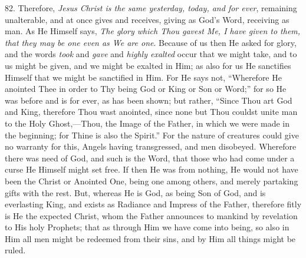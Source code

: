 82. Therefore, \emph{Jesus Christ
is the same yesterday, today, and for ever}, remaining unalterable,
and at once gives and receives, giving as God's Word, receiving as
man. As He Himself says, \emph{The glory which Thou gavest Me, I have
given to them, that they may be one even as We are one}. Because of
us then He asked for glory, and the words \emph{took} and \emph{gave}
and \emph{highly exalted} occur that we might take, and to us might be
given, and we might be exalted in Him; as also for us He
sanctifies Himself that we might be sanctified in Him. For He says
not, ``Wherefore He anointed Thee in order to Thy being God or King or
Son or Word;'' for so He was before and is for ever, as has been shown;
but rather, ``Since Thou art God and King, therefore Thou wast
anointed, since none but Thou couldst unite man to the Holy
Ghost,—Thou, the Image of the Father, in which we were made in the
beginning; for Thine is also the Spirit.'' For the nature of creatures
could give no warranty for this, Angels having transgressed, and men
disobeyed. Wherefore there was need of God, and such is the Word, that
those who had come under a curse He Himself might set free. If then He
was from nothing, He would not have been the Christ or Anointed One,
being one among others, and merely partaking gifts with the rest. But,
whereas He is God, as being Son of God, and is everlasting King, and
exists as Radiance and Impress of the Father, therefore fitly is He
the expected Christ, whom the Father announces to mankind by
revelation to His holy Prophets; that as through Him we have come into
being, so also in Him all men might be redeemed from their sins, and
by Him all things might be ruled.

